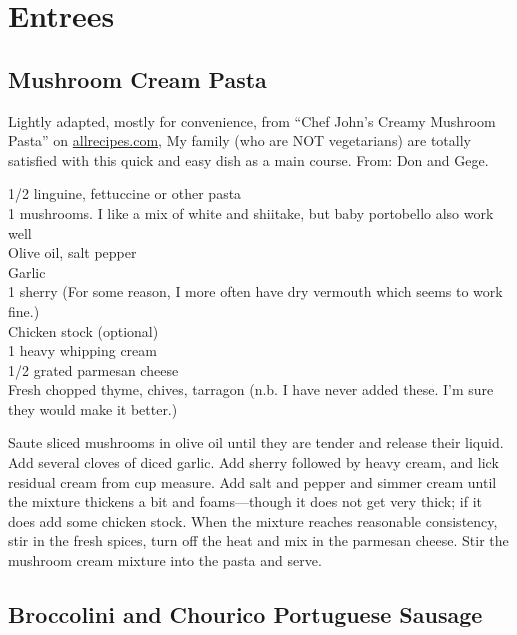 \chapter{Entrees}

\section{Mushroom Cream Pasta}

\begin{open}
    Lightly adapted, mostly for convenience, from ``Chef John's Creamy Mushroom
    Pasta'' on \url{allrecipes.com}, My family (who are NOT vegetarians) are
    totally satisfied with this quick and easy dish as a main course. From: Don
    and Gege.
\end{open}
\begin{ingredients}
    \SI{1/2}{\pound} linguine, fettuccine or other pasta\\
    \SI{1}{\pound} mushrooms. I like a mix of white and shiitake, but baby
    portobello also work well\\
    Olive oil, salt pepper\\
    Garlic\\
    \SI{1}{\tblspoon} sherry (For some reason, I more often have dry vermouth
    which seems to work fine.) \\
    Chicken stock (optional)\\
    \SI{1}{\cup} heavy whipping cream\\
    \SI{1/2}{\cup} grated parmesan cheese\\
    Fresh chopped thyme, chives, tarragon (n.b. I have never added these. I'm
    sure  they would make it better.)\\
\end{ingredients}
Saute sliced mushrooms in olive oil until they are tender and release their
liquid. Add several cloves of diced garlic. Add sherry followed by heavy cream,
and lick residual cream from cup measure. Add salt and pepper and simmer cream
until the mixture thickens a bit and foams---though it does not get very thick;
if it does add some chicken stock. When the mixture reaches reasonable
consistency, stir in the fresh spices, turn off the heat and mix in the parmesan
cheese. Stir the mushroom cream mixture into the pasta and serve.

\section{Broccolini and Chourico Portuguese Sausage}


